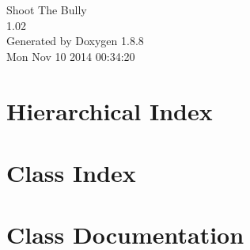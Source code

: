 \documentclass[twoside]{book}
\newcommand{\+}{\discretionary{\mbox{\scriptsize$\hookleftarrow$}}{}{}}
\newcommand{\clearemptydoublepage}{%
  \newpage{\pagestyle{empty}\cleardoublepage}%
}
\begin{document}
\hypersetup{pageanchor=false,
             bookmarks=true,
             bookmarksnumbered=true,
             pdfencoding=unicode
            }
\begin{titlepage}
\vspace*{7cm}
\begin{center}%
{\Large Shoot The Bully \\[1ex]\large 1.\+02 }\\
\vspace*{1cm}
{\large Generated by Doxygen 1.8.8}\\
\vspace*{0.5cm}
{\small Mon Nov 10 2014 00:34:20}\\
\end{center}
\end{titlepage}
\clearemptydoublepage
\tableofcontents
\clearemptydoublepage
{}
\hypersetup{pageanchor=true}

\chapter{Hierarchical Index}

\chapter{Class Index}

\chapter{Class Documentation}




























































\newpage
{}
{}
\printindex
\end{document}
